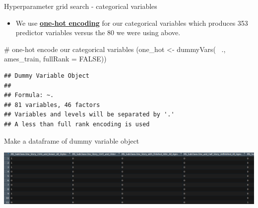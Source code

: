 \documentclass[
  10pt,
  ignorenonframetext,
]{beamer}
\newenvironment{Shaded}{}{}
\newcommand{\CommentTok}[1]{\textcolor[rgb]{0.00,0.50,0.00}{#1}}
\newcommand{\DataTypeTok}[1]{#1}
\newcommand{\KeywordTok}[1]{\textcolor[rgb]{0.00,0.00,1.00}{#1}}
\newcommand{\NormalTok}[1]{#1}
\newcommand{\OperatorTok}[1]{#1}
\newcommand{\OtherTok}[1]{\textcolor[rgb]{1.00,0.25,0.00}{#1}}
\newcommand{\StringTok}[1]{\textcolor[rgb]{0.00,0.50,0.50}{#1}}
\providecommand{\tightlist}{%
  \setlength{\itemsep}{0pt}\setlength{\parskip}{0pt}}
\begin{document}
\begin{frame}[fragile]{Hyperparameter grid search - categorical
variables}
\protect\hypertarget{hyperparameter-grid-search---categorical-variables}{}

\begin{itemize}
\tightlist
\item
  We use
  \href{https://hackernoon.com/what-is-one-hot-encoding-why-and-when-do-you-have-to-use-it-e3c6186d008f}{\textbf{one-hot
  encoding}} for our categorical variables which produces 353 predictor
  variables versus the 80 we were using above.
\end{itemize}

\begin{Shaded}
\begin{Highlighting}[]
\CommentTok{# one-hot encode our categorical variables}
\NormalTok{(one_hot <-}\StringTok{ }\KeywordTok{dummyVars}\NormalTok{(}\OperatorTok{~}\StringTok{ }\NormalTok{., ames_train, }\DataTypeTok{fullRank =} \OtherTok{FALSE}\NormalTok{))}
\end{Highlighting}
\end{Shaded}

\begin{verbatim}
## Dummy Variable Object
## 
## Formula: ~.
## 81 variables, 46 factors
## Variables and levels will be separated by '.'
## A less than full rank encoding is used
\end{verbatim}

\end{frame}

\begin{frame}[fragile]{Make a dataframe of dummy variable object}
\protect\hypertarget{make-a-dataframe-of-dummy-variable-object}{}

\begin{Shaded}
\end{Shaded}

\includegraphics{figure/OneHotEncoding.PNG}

\end{frame}
\end{document}
